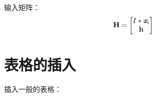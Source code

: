 输入矩阵：
\begin{equation}
	\label{eqn:matrix}
	\textbf{H} = \begin{bmatrix}
		I*\textit{\textbf{x}}_i \\ \textbf{h}
	\end{bmatrix}
\end{equation}

\section{表格的插入}
\label{sec:table}
插入一般的表格：
